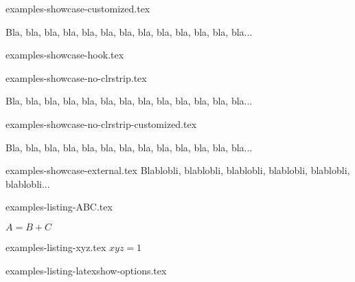 \begin{filecontents*}{examples-showcase-customized.tex}
\begin{bdocshowcase}[before = Mon début,
                     after  = Ma fin à moi,
                     color  = red]
    Bla, bla, bla, bla, bla, bla, bla, bla, bla, bla, bla, bla, bla...
\end{bdocshowcase}
\end{filecontents*}


\begin{filecontents*}{examples-showcase-hook.tex}
\begin{bdocshowcase}
\end{bdocshowcase}
\end{filecontents*}


\begin{filecontents*}{examples-showcase-no-clrstrip.tex}
\begin{bdocshowcase}[nostripe]
    Bla, bla, bla, bla, bla, bla, bla, bla, bla, bla, bla, bla, bla...
\end{bdocshowcase}
\end{filecontents*}


\begin{filecontents*}{examples-showcase-no-clrstrip-customized.tex}
\begin{bdocshowcase}[nostripe,
                     before = Mon début,
                     after  = Ma fin à moi,
                     color  = green]
    Bla, bla, bla, bla, bla, bla, bla, bla, bla, bla, bla, bla, bla...
\end{bdocshowcase}
\end{filecontents*}


\begin{filecontents*}{examples-showcase-external.tex}
Blablobli, blablobli, blablobli, blablobli, blablobli, blablobli...
\end{filecontents*}


\begin{filecontents*}{examples-listing-ABC.tex}
\begin{bdoclatex}[sbs]
    $A = B + C$
\end{bdoclatex}
\end{filecontents*}


\begin{filecontents*}{examples-listing-xyz.tex}
$x y z = 1$
\end{filecontents*}


\begin{filecontents*}{examples-listing-latexshow-options.tex}
\end{filecontents*}


